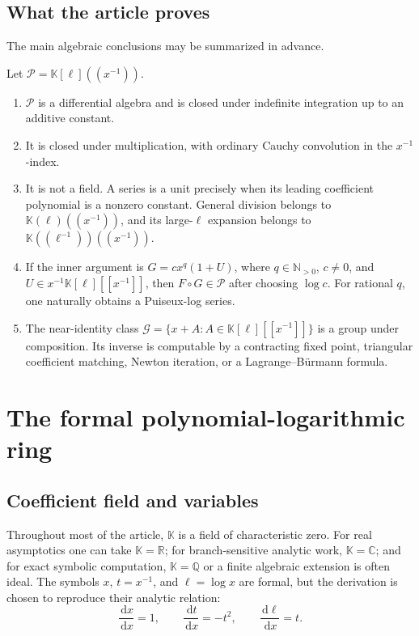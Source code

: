 \documentclass[11pt,oneside]{article}
\numberwithin{equation}{section}
\theoremstyle{definition}
\newcommand{\K}{\mathbb K}
\newcommand{\Q}{\mathbb Q}
\newcommand{\C}{\mathbb C}
\newcommand{\R}{\mathbb R}
\newcommand{\N}{\mathbb N}
\newcommand{\PL}{\mathscr P}
\newcommand{\Gnear}{\mathscr G}
\newcommand{\dd}{\,\mathrm d}
\begin{document}
\subsection{What the article proves}

The main algebraic conclusions may be summarized in advance.

\begin{summarybox}
Let \(\PL=\K[\ell]((x^{-1}))\).
\begin{enumerate}[label=\textup{(\roman*)}]
\item \(\PL\) is a differential algebra and is closed under indefinite
  integration up to an additive constant.
\item It is closed under multiplication, with ordinary Cauchy convolution in
  the \(x^{-1}\)-index.
\item It is not a field.  A series is a unit precisely when its leading
  coefficient polynomial is a nonzero constant.  General division belongs to
  \(\K(\ell)((x^{-1}))\), and its large-\(\ell\) expansion belongs to
  \(\K((\ell^{-1}))((x^{-1}))\).
\item If the inner argument is
  \(G=cx^q(1+U)\), where \(q\in\N_{>0}\), \(c\ne0\), and
  \(U\in x^{-1}\K[\ell][[x^{-1}]]\), then \(F\circ G\in\PL\) after choosing
  \(\log c\).  For rational \(q\), one naturally obtains a Puiseux-log series.
\item The near-identity class
  \(\Gnear=\{x+A:A\in\K[\ell][[x^{-1}]]\}\) is a group under composition.
  Its inverse is computable by a contracting fixed point, triangular
  coefficient matching, Newton iteration, or a Lagrange--B\"urmann formula.
\end{enumerate}
\end{summarybox}

\section{The formal polynomial-logarithmic ring}\label{sec:formal-ring}

\subsection{Coefficient field and variables}

Throughout most of the article, \(\K\) is a field of characteristic zero.  For
real asymptotics one can take \(\K=\R\); for branch-sensitive analytic work,
\(\K=\C\); and for exact symbolic computation, \(\K=\Q\) or a finite algebraic
extension is often ideal.  The symbols \(x\), \(t=x^{-1}\), and
\(\ell=\log x\) are formal, but the derivation is chosen to reproduce their
analytic relation:
\begin{equation}\label{eq:basic-derivation}
  \frac{\dd x}{\dd x}=1,
  \qquad \frac{\dd t}{\dd x}=-t^2,
  \qquad \frac{\dd\ell}{\dd x}=t.
\end{equation}
\end{document}
